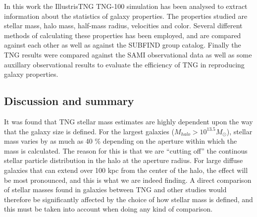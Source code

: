 
In this work the IllustrisTNG TNG-100 simulation has been analysed to extract information about the statistics of galaxy properties. The properties studied are stellar mass, halo mass, half-mass radius, velocities and color. Several different methods of calculating these properties has been employed, and are compared against each other as well as against the SUBFIND group catalog. Finally the TNG results were compared against the SAMI observational data as well as some auxillary observational results to evaluate the efficiency of TNG in reproducing galaxy properties.

\subsection{Discussion and summary}
It was found that TNG stellar mass estimates are highly dependent upon the way that the galaxy size is defined. For the largest galaxies ($M_{halo} > 10^{13.5} M_\odot$), stellar mass varies by as much as 40 \% depending on the aperture within which the mass is calculated. The reason for this is that we are ``cutting off'' the continous stellar particle distribution in the halo at the aperture radius. For large diffuse galaxies that can extend over 100 kpc from the center of the halo, the effect will be most pronounced, and this is what we are indeed finding. A direct comparison of stellar masses found in galaxies between TNG and other studies would therefore be significantly affected by the choice of how stellar mass is defined, and this must be taken into account when doing any kind of comparison. 


